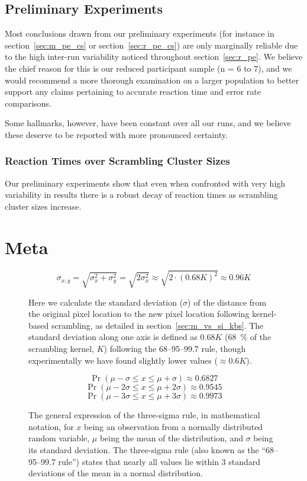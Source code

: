     \section{Preliminary Experiments}\label{sec:d_pe}
	Most conclusions drawn from our preliminary experiments (for instance in section~\ref{sec:m_pe_cs} or section~\ref{sec:r_pe_cs}) are only marginally reliable due to the high inter-run variability noticed throughout section~\ref{sec:r_pe}.
	We believe the chief reason for this is our reduced participant sample (n = 6 to 7), and we would recommend a more thorough examination on a larger population to better support any claims pertaining to accurate reaction time and error rate comparisons.
	
	Some hallmarks, however, have been constant over all our runs, and we believe these deserve to be reported with more pronounced certainty.
	\subsection{Reaction Times over Scrambling Cluster Sizes}
	    Our preliminary experiments show that even when confronted with very high variability in results there is a robust decay of reaction times as scrambling cluster sizes increase. 
\chapter{Meta}
    \begin{figure}[H]
	\[ \sigma_{x,y} = \sqrt{\sigma_{x}^{2}+\sigma_{y}^{2}} = \sqrt{2\sigma_{x}^{2}} \approx \sqrt{2 \cdot (0.68 K)^{2}} \approx 0.96K\]
	\caption{Here we calculate the standard deviation ($\sigma$) of the distance from the original pixel location to the new pixel location following kernel-based scrambling, as detailed in section~\ref{sec:m_vs_si_kbs}. The standard deviation along one axis is defined as $0.68K$ (\SI{68}{\percent} of the scrambling kernel, $K$) following the 68–95–99.7 rule, though experimentally we have found slightly lower values ($\approx 0.6K$).}\label{eq:lrgn}
    \end{figure}
    \begin{figure}[H]
	\[\Pr(\mu - \sigma \le x \le \mu + \sigma) \approx 0.6827 \]
	\[\Pr(\mu - 2\sigma \le x \le \mu + 2\sigma) \approx 0.9545 \]
	\[\Pr(\mu - 3\sigma \le x \le \mu + 3\sigma) \approx 0.9973 \]
	\caption{The general expression of the three-sigma rule, in mathematical notation, for $x$ being an observation from a normally distributed random variable, $\mu$ being the mean of the distribution, and $\sigma$ being its standard deviation. The three-sigma rule (also known as the “68–95–99.7 rule”) states that nearly all values lie within 3 standard deviations of the mean in a normal distribution.}\label{eq:3s}
    \end{figure}
